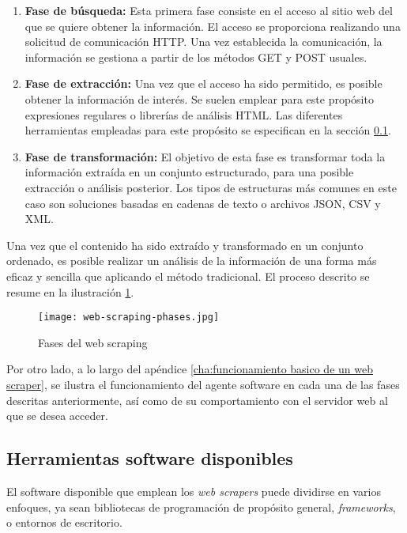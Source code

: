 \begin{enumerate}
\item {\bfseries Fase de búsqueda:} Esta primera fase consiste en el acceso al sitio web del que se
quiere obtener la información. El acceso se proporciona realizando una solicitud de comunicación HTTP.
Una vez establecida la comunicación, la información se gestiona a partir de los métodos GET y POST usuales.

\item {\bfseries Fase de extracción:} Una vez que el acceso ha sido permitido, es posible obtener la
información de interés. Se suelen emplear para este propósito expresiones regulares o librerías de
análisis HTML. Las diferentes herramientas empleadas para este propósito se especifican en la sección
\ref{subsec:herramientas software disponibles}.

\item {\bfseries Fase de transformación:} El objetivo de esta fase es transformar toda la información
extraída en un conjunto estructurado, para una posible extracción o análisis posterior. Los tipos de
estructuras más comunes en este caso son soluciones basadas en cadenas de texto o archivos JSON, CSV y XML.
\end{enumerate}

Una vez que el contenido ha sido extraído y transformado en un conjunto ordenado, es posible realizar un
análisis de la información de una forma más eficaz y sencilla que aplicando el método tradicional. El
proceso descrito se resume en la ilustración \ref{img:web-scraping-phases}.

\begin{figure}[tphb]
\centering
\texttt{[image: web-scraping-phases.jpg]}
\caption{Fases del web scraping}
\label{img:web-scraping-phases}
\end{figure}

Por otro lado, a lo largo del apéndice \ref{cha:funcionamiento basico de un web scraper}, se ilustra el
funcionamiento del agente software en cada una de las fases descritas anteriormente, así como de su
comportamiento con el servidor web al que se desea acceder.

\subsection{Herramientas software disponibles}
\label{subsec:herramientas software disponibles}

El software disponible que emplean los \emph{web scrapers} puede dividirse en varios enfoques, ya sean 
bibliotecas de programación de propósito general, \emph{frameworks}, o entornos de escritorio.

